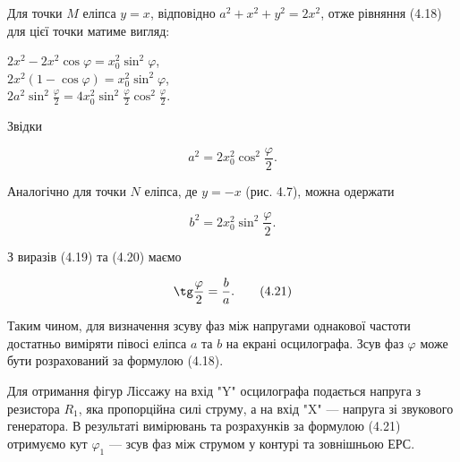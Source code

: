 \documentclass[12pt,a4paper]{article}
\begin{document}
    Для точки $M$ еліпса $y = x$, відповідно $a^2 + x^2 + y^2 = 2x^2$,
    отже рівняння (4.18) для цієї точки матиме вигляд:

    \begin{center}
        $2x^2 - 2x^2 \cos \varphi = x_0^2 \sin^2 \varphi$, \\ \vspace{0.3em}
        $2x^2 (1 - \cos \varphi) = x_0^2 \sin^2 \varphi$, \\ \vspace{0.3em}
        $2a^2 \sin^2 \frac{\varphi}{2} = 4x_0^2 \sin^2 \frac{\varphi}{2} \cos^2 \frac{\varphi}{2}$.
    \end{center}

    Звідки

    \vspace{0.5em}

    \begin{equation}
        a^2 = 2x_0^2 \cos^2 \frac{\varphi}{2}.
        \tag{4.19}
    \end{equation}

    \vspace{0.5em}

    Аналогічно для точки $N$ еліпса, де $y = -x$ (рис. 4.7), можна одержати

    \vspace{0.5em}

    \begin{equation}
        b^2 = 2x_0^2 \sin^2 \frac{\varphi}{2}.
        \tag{4.20}
    \end{equation}

    \vspace{0.5em}

    З виразів (4.19) та (4.20) маємо

    \vspace{0.5em}

    \begin{equation}
        \tg \frac{\varphi}{2} = \frac{b}{a}.
        \tag{4.21}
    \end{equation}

    \vspace{0.5em}

    Таким чином, для визначення зсуву фаз між напругами однакової
    частоти достатньо виміряти півосі еліпса $a$ та $b$ на
    екрані осцилографа.
    Зсув фаз $\varphi$ може бути розрахований за формулою
    (4.18).

    Для отримання фігур Ліссажу на вхід "Y" осцилографа подається
    напруга з резистора $R_1$, яка пропорційна силі струму, а на вхід
    "X" --- напруга зі звукового генератора.
    В результаті вимірювань та розрахунків за формулою
    (4.21) отримуємо кут $\varphi_1$ --- зсув фаз між струмом у
    контурі та зовнішньою ЕРС.
\end{document}
